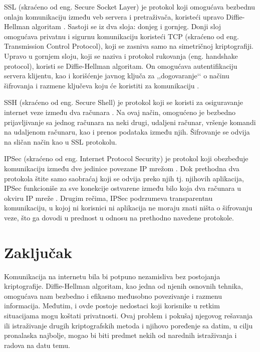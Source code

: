 \documentclass[a4paper]{article}
\begin{document}
SSL (skraćeno od eng. Secure Socket Layer) je protokol koji omogućava bezbednu onlajn komunikaciju između veb servera i pretraživača, koristeći upravo Diffie-Hellman algoritam \cite{use}. Sastoji se iz dva sloja: donjeg i gornjeg. Donji sloj omogućava privatnu i sigurnu komunikaciju koristeći TCP (skraćeno od eng. Transmission Control Protocol), koji se zasniva samo na simetričnoj kriptografiji. Upravo u gornjem sloju, koji se naziva i protokol rukovanja (eng. handshake protocol), koristi se Diffie-Hellman algoritam. On omogućava autentifikaciju servera klijentu, kao i korišćenje javnog ključa za ,,dogovaranje‘‘ o načinu šifrovanja i razmene ključeva koju će koristiti za komunikaciju \cite{use}. 


SSH (skraćeno od eng. Secure Shell) je protokol koji se koristi za osiguravanje internet veze između dva računara \cite{use}. Na ovaj način, omogućeno je bezbedno prijavljivanje sa jednog računara na neki drugi, udaljeni računar, vršenje komandi na udaljenom računaru, kao i prenos podataka između njih. Šifrovanje se odvija na sličan način kao u SSL protokolu.

IPSec (skraćeno od eng. Internet Protocol Security) je protokol koji obezbeđuje komunikaciju između dve jedinice povezane IP mrežom \cite{use}. Dok prethodna dva protokola štite samo saobraćaj koji se odvija preko njih tj. njihovih aplikacija, IPSec funkcioniše za sve konekcije ostvarene između bilo koja dva računara u okviru IP mreže \cite{use}. Drugim rečima, IPSec podrzumeva transparentnu komunikaciju, u kojoj ni korisnici ni aplikacija ne moraju znati ništa o šifrovanju veze, što ga dovodi u prednost u odnosu na prethodno navedene protokole.
\section{Zaključak}
\label{sec:zakljucak}

Komunikacija na internetu bila bi potpuno nezamisliva bez postojanja kriptografije. Diffie-Hellman algoritam, kao jedna od njenih osnovnih tehnika, omogućava nam bezbedno i efikasno međusobno povezivanje i razmenu informacija. Međutim, i ovde postoje nedostaci koji korisnike u retkim situacijama mogu koštati privatnosti. Ovaj problem i pokušaj njegovog rešavanja ili istraživanje drugih kriptografskih metoda i njihovo poređenje sa datim, u cilju pronalaska najbolje, mogao bi biti predmet nekih od narednih istraživanja i radova na datu temu.
\end{document}
